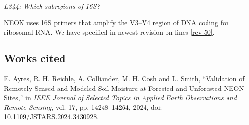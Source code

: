 \documentclass[11pt]{article}
\begin{document}
\bigskip

\textit{L344: Which subregions of 16S?}

NEON uses 16S primers that amplify the V3--V4 region of DNA coding for ribosomal RNA. We have specified in newest revision on lines \ref{rev-50}.

\subsection*{Works cited}

E. Ayres, R. H. Reichle, A. Colliander, M. H. Cosh and L. Smith, ``Validation of Remotely Sensed and Modeled Soil Moisture at Forested and Unforested NEON Sites,'' in \textit{IEEE Journal of Selected Topics in Applied Earth Observations and Remote Sensing}, vol. 17, pp. 14248--14264, 2024, doi: 10.1109/JSTARS.2024.3430928.
\end{document}
